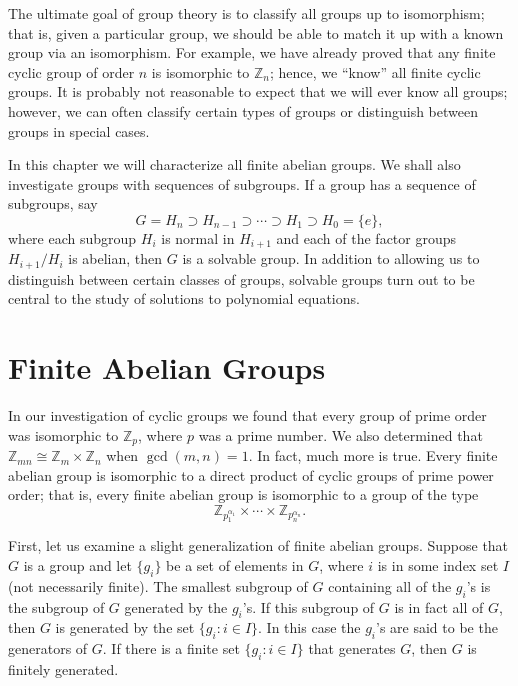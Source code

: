  

The ultimate goal of group theory is to classify all groups up to
isomorphism; that is, given a particular group, we should be able to
match it up with a known group via an isomorphism. For example, we
have already proved that any finite cyclic group of order $n$ is
isomorphic to ${\mathbb Z}_n$; hence, we ``know'' all finite cyclic
groups. It is probably not reasonable to expect that we will ever know
all groups; however, we can often classify certain types of groups or
distinguish between groups in special cases.  

In this chapter we will characterize all finite abelian groups. We
shall also investigate groups with sequences of subgroups.  If a group
has a sequence of subgroups, say 
\[
G = H_n \supset H_{n-1} \supset \cdots \supset H_1 \supset H_0 = \{ e
\}, 
\]
where each subgroup $H_i$ is normal in $H_{i+1}$ and each of the
factor groups $H_{i+1}/H_i$ is abelian, then $G$ is a solvable group.
In addition to allowing us to distinguish between certain classes of
groups, solvable groups turn out to be central to the study of
solutions to polynomial equations.
 

\section{Finite Abelian Groups}

In our investigation of cyclic groups we found that every group of
prime order was isomorphic to ${\mathbb Z}_p$, where $p$ was a prime
number.  We also determined that ${\mathbb Z}_{mn} \cong {\mathbb Z}_m
\times {\mathbb Z}_n$ when $\gcd(m, n) =1$. In fact, much more is true.
Every finite abelian group is isomorphic to a direct product of cyclic
groups of prime power order; that is, every finite abelian group is
isomorphic to a group of the type 
\[
{\mathbb Z}_{p_1^{\alpha_1}} \times \cdots \times {\mathbb
Z}_{p_n^{\alpha_n}}.
\]

First, let us examine a slight generalization  of finite abelian
groups. Suppose that $G$ is a group and let $\{ g_i\}$ be a set of 
elements in $G$, where $i$ is in some index set $I$ (not necessarily 
finite).  The smallest subgroup of $G$ containing all of the $g_i$'s 
is the subgroup of $G$ {\bfi generated\/} by the $g_i$'s. If this 
subgroup of $G$ is in fact all of $G$, then $G$ is generated by the 
set $\{g_i : i \in I \}$. In this case the $g_i$'s are said to be 
the {\bfi generators\/} of $G$. If there is a finite set 
$\{ g_i : i \in I \}$ that generates $G$, then $G$ is {\bfi finitely 
generated}.
 
